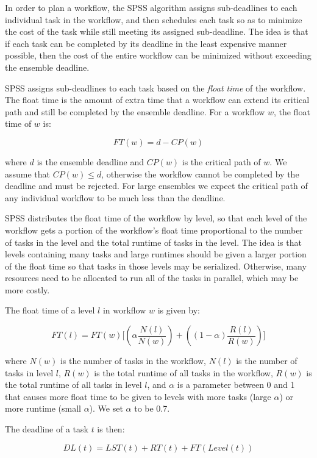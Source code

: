 \documentclass{sig-alternate}
\begin{document}
In order to plan a workflow, the SPSS algorithm assigns 
sub-deadlines to each individual task in the workflow, and then schedules 
each task so as to minimize the cost of the task while still meeting its 
assigned sub-deadline. The idea is that if each task can be completed by 
its deadline in the least expensive manner possible, then the cost of the
entire workflow can be minimized without exceeding the ensemble deadline.

SPSS assigns sub-deadlines to each task based on the \emph{float time}
of the workflow. The float time is the amount of extra time that a workflow
can extend its critical path and still be completed by the ensemble deadline.
For a workflow $w$, the float time of $w$ is:

$$
FT(w) = d - CP(w)
$$

where $d$ is the ensemble deadline and $CP(w)$ is the critical path of $w$.
We assume that $CP(w) \leq d$, otherwise the workflow cannot be completed 
by the deadline and must be rejected. For large ensembles we expect the 
critical path of any individual workflow to be much less than the deadline.

SPSS distributes the float time of the workflow by level, so that each level
of the workflow gets a portion of the workflow's float time proportional to
the number of tasks in the level and the total runtime of tasks in the level.
The idea is that levels containing many tasks and large runtimes should be given
a larger portion of the float time so that tasks in those levels may be serialized.
Otherwise, many resources need to be allocated to run all of the tasks in 
parallel, which may be more costly.

The float time of a level $l$ in workflow $w$ is given by:

$$
FT(l) = FT(w) \Biggl[\left({\alpha}\frac{N(l)}{N(w)}\right) + \left({(1 - \alpha)}\frac{R(l)}{R(w)} \right)\Biggr]
$$

where $N(w)$ is the number of tasks in the workflow, $N(l)$ is the number of tasks 
in level $l$, $R(w)$ is the total runtime of all tasks in the workflow, $R(w)$ is
the total runtime of all tasks in level $l$, and $\alpha$ is a parameter between
0 and 1 that causes more float time to be given to levels with more tasks (large 
$\alpha$) or more runtime (small $\alpha$). We set $\alpha$ to be 0.7.

The deadline of a task $t$ is then:

$$
DL(t) = LST(t) + RT(t) + FT(Level(t))
$$
\end{document}
